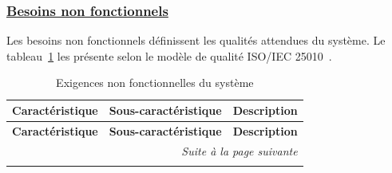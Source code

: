 \subsubsection*{\underline{\textbf{Besoins non fonctionnels}}}
Les besoins non fonctionnels définissent les qualités attendues du système. \newline
{}
Le tableau~\ref{tab:exigences-non-fonctionnelles} les présente selon le modèle de qualité ISO/IEC 25010~\cite{ISO25010}.

\begin{longtable}{|p{3.2cm}|p{4cm}|p{8cm}|}
\caption{Exigences non fonctionnelles du système}
\label{tab:exigences-non-fonctionnelles} \\
\hline
\textbf{Caractéristique} & \textbf{Sous-caractéristique} & \textbf{Description} \\
\hline
\endfirsthead
\hline
\textbf{Caractéristique} & \textbf{Sous-caractéristique} & \textbf{Description} \\
\hline
\endhead
\hline \multicolumn{3}{r}{\textit{Suite à la page suivante}} \\
\endfoot
\hline
\endlastfoot


\end{longtable}
